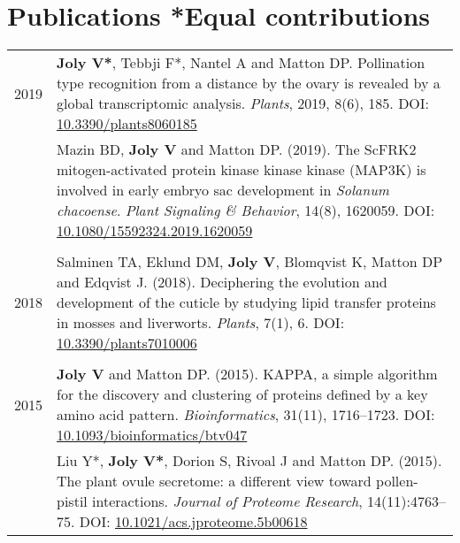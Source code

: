 \documentclass[letterpaper,12pt]{article}
\begin{document}
\vspace{6mm}

\section[Publications]{Publications \hfill \small{*Equal contributions}}

\begin{tabularx}{\textwidth}{@{}r|X@{}}

2019
& \textbf{Joly V*}, Tebbji F*, Nantel A and Matton DP.
  Pollination type recognition from a distance by the ovary is revealed by a
  global transcriptomic analysis.
  \emph{Plants}, 2019, 8(6), 185.
  DOI: \href{http://doi.org/10.3390/plants8060185}{10.3390/plants8060185}
  \vspace{3mm}
  \\

& Mazin BD, \textbf{Joly V} and Matton DP. (2019).
  The ScFRK2 mitogen-activated protein kinase kinase kinase (MAP3K) is involved
  in early embryo sac development in \emph{Solanum chacoense}.
  \emph{Plant Signaling \& Behavior}, 14(8), 1620059.
  DOI: \href{http://doi.org/10.1080/15592324.2019.1620059}
  {10.1080/15592324.2019.1620059}
  \\

\multicolumn{2}{c}{} \\

2018
& Salminen TA, Eklund DM, \textbf{Joly V}, Blomqvist K, Matton DP
  and Edqvist J. (2018).
  Deciphering the evolution and development of the cuticle by studying lipid
  transfer proteins in mosses and liverworts.
  \emph{Plants}, 7(1), 6.
  DOI: \href{http://doi.org/10.3390/plants7010006}{10.3390/plants7010006}
  \\

\multicolumn{2}{c}{} \\

2015
& \textbf{Joly V} and Matton DP. (2015).
  KAPPA, a simple algorithm for the discovery and clustering of proteins defined
  by a key amino acid pattern.
  \emph{Bioinformatics}, 31(11), 1716--1723.
  DOI: \href{http://doi.org/10.1093/bioinformatics/btv047}
  {10.1093/bioinformatics/btv047}
  \vspace{3mm}
  \\

& Liu Y*, \textbf{Joly V*}, Dorion S, Rivoal J and Matton DP. (2015).
  The plant ovule secretome: a different view toward pollen-pistil interactions.
  \emph{Journal of Proteome Research}, 14(11):4763--75.
  DOI: \href{http://doi.org/10.1021/acs.jproteome.5b00618}
  {10.1021/acs.jproteome.5b00618}
  \vspace{3mm}
  \\


\end{tabularx}
\end{document}
